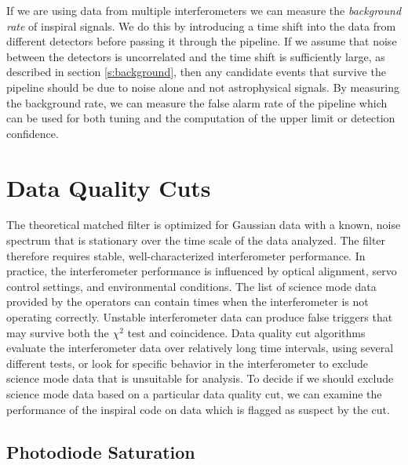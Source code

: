 If we are using data from multiple interferometers we can measure the
\emph{background rate} of inspiral signals. We do this by introducing a time
shift into the data from different detectors before passing it through the
pipeline. If we assume that noise between the detectors is uncorrelated and
the time shift is sufficiently large, as described in section
\ref{s:background}, then any candidate events that survive the pipeline should
be due to noise alone and not astrophysical signals. By measuring the
background rate, we can measure the false alarm rate of the pipeline which can
be used for both tuning and the computation of the upper limit or detection
confidence.

\section{Data Quality Cuts}
\label{s:dq}

The theoretical matched filter is optimized for Gaussian data with a known,
noise spectrum that is stationary over the time scale of the data analyzed.
The filter therefore requires stable, well-characterized interferometer
performance. In practice, the interferometer performance is influenced by
optical alignment, servo control settings, and environmental conditions. The
list of science mode data provided by the operators can contain times when the
interferometer is not operating correctly. Unstable interferometer data can
produce false triggers that may survive both the $\chi^2$ test and
coincidence.  Data quality cut algorithms evaluate the interferometer data
over relatively long time intervals, using several different tests, or look
for specific behavior in the interferometer to exclude science mode data that
is unsuitable for analysis.  To decide if we should exclude science mode data
based on a particular data quality cut, we can examine the performance of the
inspiral code on data which is flagged as suspect by the cut. 

\subsection{Photodiode Saturation}
\label{ss:photodiode}

